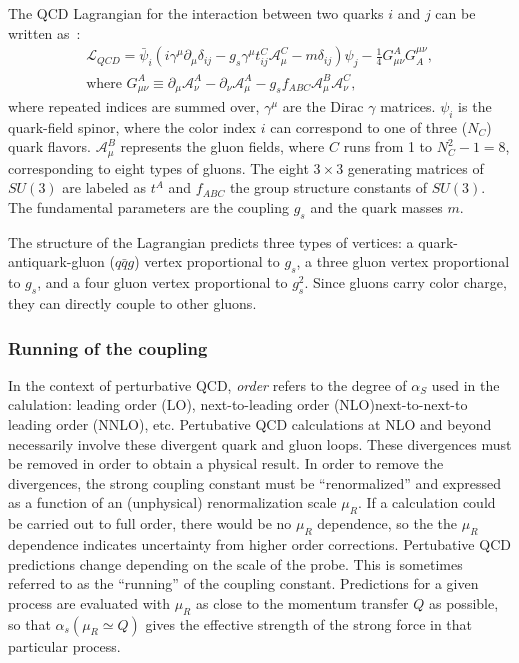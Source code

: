 The QCD Lagrangian for the interaction between two quarks $i$ and $j$ can be written as~\cite{PDG}:
\begin{eqnarray}
\mathcal{L}_{QCD} = \bar{\psi}_i(i\gamma^{\mu}\partial_{\mu}\delta_{ij} - g_s\gamma^\mu t^C_{ij}\mathcal{A}^C_\mu -m\delta_{ij})\psi_j -\frac{1}{4}G^{A}_{\mu\nu}G^{\mu\nu}_A,\\
\mbox{where } G^A_{\mu\nu} \equiv \partial_\mu \mathcal{A}^A_{\nu}-\partial_\nu \mathcal{A}^A_{\mu} - g_s f_{ABC} \mathcal{A}^B_{\mu} \mathcal{A}^C_{\nu},
\end{eqnarray}
where repeated indices are summed over, $\gamma^{\mu}$ are the Dirac $\gamma$ matrices. ${\psi}_i$ is the quark-field spinor, where the color index $i$ can correspond to one of three ($N_C$) quark flavors. $\mathcal{A}^{B}_{\mu}$ represents the gluon fields, where $C$ runs from 1 to $N_C^2-1=8$, corresponding to eight types of gluons.  The eight $3 \times 3$ generating matrices of $SU(3)$ are labeled as $t^{A}$ and $f_{ABC}$ the group structure constants of $SU(3)$. The fundamental parameters are the coupling $g_s$ and the quark masses $m$.

The structure of the Lagrangian predicts three types of vertices: a quark-antiquark-gluon ($q\bar{q}g$) vertex proportional to $g_s$, a three gluon vertex  proportional to $g_s$, and a four gluon vertex proportional to $g_s^2$. Since gluons carry color charge, they can directly couple to other gluons.
\subsubsection{Running of the coupling}

In the context of perturbative QCD, \emph{order} refers to the degree of $\alpha_S$ used in the calulation: leading order (LO), next-to-leading order (NLO)next-to-next-to leading order (NNLO), etc. Pertubative QCD calculations at NLO and beyond necessarily involve these divergent quark and gluon loops. These divergences must be removed in order to obtain a physical result. In order to remove the divergences, the strong coupling constant must be ``renormalized'' and expressed as a function of an (unphysical) renormalization scale $\mu_R$. If a calculation could be carried out to full order, there would be no $\mu_R$ dependence, so the the $\mu_R$ dependence indicates uncertainty from higher order corrections. Pertubative QCD predictions change depending on the scale of the probe. This is sometimes referred to as the ``running'' of the coupling constant. Predictions for a given process are evaluated with $\mu_R$ as close to the momentum transfer $Q$ as possible, so that $\alpha_s(\mu_R \simeq Q)$ gives the effective strength of the strong force in that particular process. 

